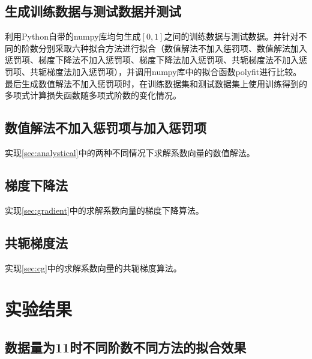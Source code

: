 \documentclass{hitreport}
\begin{document}
\subsection{生成训练数据与测试数据并测试}

利用Python自带的numpy库均匀生成$\left[0,1\right]$之间的训练数据与测试数据。并针对不同的阶数分别采取六种拟合方法进行拟合（数值解法不加入惩罚项、数值解法加入惩罚项、梯度下降法不加入惩罚项、梯度下降法加入惩罚项、共轭梯度法不加入惩罚项、共轭梯度法加入惩罚项），并调用numpy库中的拟合函数polyfit进行比较。最后生成数值解法不加入惩罚项时，在训练数据集和测试数据集上使用训练得到的多项式计算损失函数随多项式阶数的变化情况。



\subsection{数值解法不加入惩罚项与加入惩罚项}

实现\ref{sec:analystical}中的两种不同情况下求解系数向量的数值解法。



\subsection{梯度下降法}

实现\ref{sec:gradient}中的求解系数向量的梯度下降算法。



\subsection{共轭梯度法}

实现\ref{sec:cg}中的求解系数向量的共轭梯度算法。



\section{实验结果}


\subsection{数据量为11时不同阶数不同方法的拟合效果}
\end{document}
